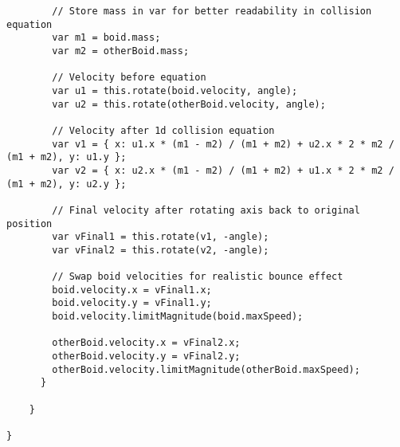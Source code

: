 \begin{lstlisting}
        // Store mass in var for better readability in collision equation
        var m1 = boid.mass;
        var m2 = otherBoid.mass;

        // Velocity before equation
        var u1 = this.rotate(boid.velocity, angle);
        var u2 = this.rotate(otherBoid.velocity, angle);

        // Velocity after 1d collision equation
        var v1 = { x: u1.x * (m1 - m2) / (m1 + m2) + u2.x * 2 * m2 / (m1 + m2), y: u1.y };
        var v2 = { x: u2.x * (m1 - m2) / (m1 + m2) + u1.x * 2 * m2 / (m1 + m2), y: u2.y };

        // Final velocity after rotating axis back to original position
        var vFinal1 = this.rotate(v1, -angle);
        var vFinal2 = this.rotate(v2, -angle);

        // Swap boid velocities for realistic bounce effect
        boid.velocity.x = vFinal1.x;
        boid.velocity.y = vFinal1.y;
        boid.velocity.limitMagnitude(boid.maxSpeed);

        otherBoid.velocity.x = vFinal2.x;
        otherBoid.velocity.y = vFinal2.y;
        otherBoid.velocity.limitMagnitude(otherBoid.maxSpeed);
      }

    }

}
\end{lstlisting}

